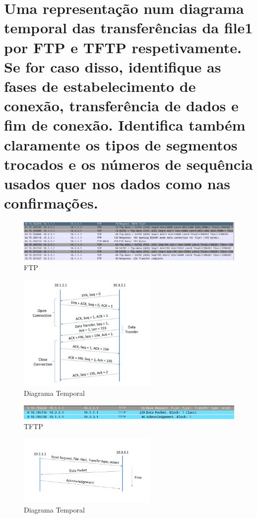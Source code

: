 \documentclass[a4paper]{report}
\begin{document}
\section{Uma representação num diagrama temporal das transferências da file1 por FTP e TFTP respetivamente. Se for caso disso,
identifique as fases de estabelecimento de conexão, transferência de dados e fim de conexão. Identifica também claramente
os tipos de segmentos trocados e os números de sequência usados quer nos dados como nas confirmações.}

\begin{figure}[H]
    \centering 
    \includegraphics[width=\textwidth]{images/2ftp.png}  
    \caption{FTP}
    \label{fig:2ftp}
\end{figure}

\begin{figure}[H]
    \centering 
    \includegraphics[width=0.6\textwidth]{images/diagrama.png}  
    \caption{Diagrama Temporal}
    \label{fig:diagrama}
\end{figure}

\begin{figure}[H]
    \centering 
    \includegraphics[width=\textwidth]{images/2tftp.png}  
    \caption{TFTP}
    \label{fig:2tft:}
\end{figure}

\begin{figure}[H]
    \centering 
    \includegraphics[width=0.6\textwidth]{images/diagrama2.png}  
    \caption{Diagrama Temporal}
    \label{fig:diagrama2}
\end{figure}
\end{document}
